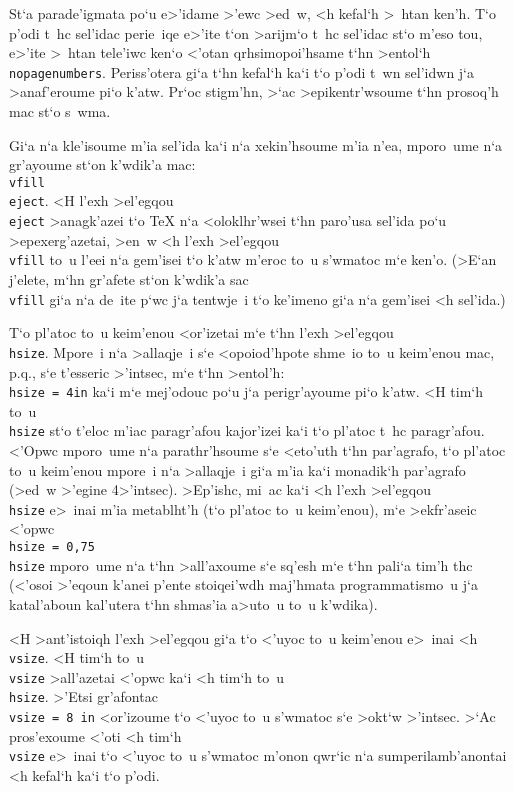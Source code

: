 St`a parade'igmata po`u e>'idame >'ewc >ed~w, <h kefal`h >~htan ken'h.  
T`o p'odi t~hc sel'idac perie~iqe e>'ite t`on >arijm`o t~hc sel'idac
st`o m'eso tou, e>'ite >~htan tele'iwc ken`o <'otan qrhsimopoi'hsame
t`hn >entol`h {\tt \\nopagenumbers}.  Periss'otera gi`a t`hn kefal`h
ka`i t`o p'odi t~wn sel'idwn j`a >anaf'eroume pi`o k'atw.  Pr`oc
stigm'hn, >`ac >epikentr'wsoume t`hn prosoq'h mac st`o s~wma.

Gi`a n`a kle'isoume m'ia sel'ida ka`i n`a xekin'hsoume m'ia n'ea,
mporo~ume n`a gr'ayoume st`on k'wdik'a mac: {\tt \\vfill \\eject}.  <H
l'exh >el'egqou {\tt \\eject} >anagk'azei t`o {\rm \TeX} n`a
<oloklh\-r'w\-sei t`hn paro'usa sel'ida po`u >epexerg'azetai, >en~w <h
l'exh >el'egqou {\tt \\vfill} to~u l'eei n`a gem'i\-sei t`o k'atw m'eroc
to~u s'wmatoc m`e ken'o. (>E`an j'elete, m`hn gr'afete st`on
k'wdik'a sac {\tt \\vfill} gi`a n`a de~ite p`wc j`a tentwje~i t`o
ke'imeno gi`a n`a gem'isei <h sel'ida.)

{\hsize=4in
T`o pl'atoc to~u keim'enou <or'izetai m`e t`hn l'exh >el'egqou {\tt     
\\hsize}.  Mpore~i n`a >allaqje~i s`e <opoiod'hpote shme~io to~u
keim'enou mac, p.q., s`e t'esseric >'intsec, m`e t`hn >entol'h: {\tt
\\hsize = 4\NB in} ka`i m`e mej'odouc po`u j`a perigr'ayoume pi`o k'atw.
<H tim`h to~u {\tt \\hsize} st`o t'e\-loc m'iac pa\-ra\-gr'a\-fou
kajor'izei ka`i t`o pl'atoc t~hc para\-gr'a\-fou.  <'Opwc mporo~ume n`a
parathr'hsoume s`e <eto'uth t`hn par'agrafo, t`o pl'atoc to~u
kei\-m'e\-nou mpore~i n`a >allaqje~i gi`a m'ia ka`i monadik`h par'agrafo
(>ed~w >'egine 4\NB >'intsec).  >Ep'ishc, mi~ac ka`i <h l'exh >el'egqou
{\tt \\hsize} e>~inai m'ia metablht'h (t`o pl'atoc to~u keim'enou), m`e
>ekfr'aseic <'opwc {\tt \\hsize =  0,75\\hsize} mporo~ume n`a t`hn
>all'axoume s`e sq'esh m`e t`hn pali`a tim'h thc (<'osoi >'eqoun k'anei
p'ente stoiqei'wdh maj'hmata programmatismo~u j`a katal'aboun kal'utera
t`hn shmas'ia a>uto~u to~u k'wdika).
\par }

<H >ant'istoiqh l'exh >el'egqou gi`a t`o <'uyoc to~u keim'enou e>~inai
<h {\tt \\vsize}. <H tim`h to~u {\tt \\vsize} >all'azetai <'opwc ka`i <h
tim`h to~u {\tt \\hsize}.  >'Etsi gr'afontac {\tt \\vsize = 8 in}
<or'izoume t`o <'uyoc to~u s'wmatoc s`e >okt`w >'intsec. >`Ac
pros'exoume <'oti <h tim`h {\tt \\vsize} e>~inai t`o <'uyoc to~u
s'wmatoc m'onon qwr`ic n`a sumperi\-lam\-b'ano\-ntai <h kefal`h ka`i t`o
p'odi.

